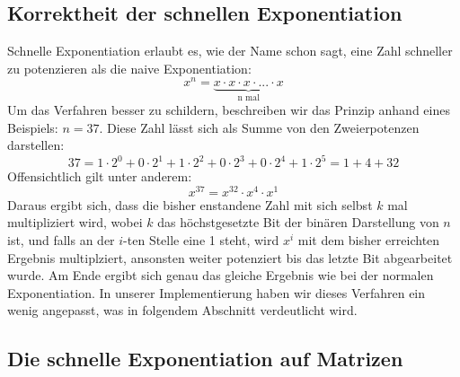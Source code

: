\documentclass[course=erap]{aspdoc}
\begin{document}
\subsection{Korrektheit der schnellen Exponentiation}%
Schnelle Exponentiation erlaubt es, wie der Name schon sagt, eine Zahl schneller zu potenzieren als die naive Exponentiation: \begin{equation}
x^n = \underbrace{x \cdot x \cdot x \cdot ... \cdot x}_\text{n mal}
\end{equation} 
Um das Verfahren besser zu schildern, beschreiben wir das Prinzip anhand eines Beispiels: $n = 37$. Diese Zahl lässt sich als Summe von den Zweierpotenzen darstellen:
\begin{equation}
 37 = 1 \cdot 2^0 + 0 \cdot 2^1 + 1 \cdot 2^2 + 0 \cdot 2^3 + 0 \cdot 2^4 + 1 \cdot 2^5 = 1 + 4 + 32
\end{equation}
Offensichtlich gilt unter anderem: 
\begin{equation}
    x^{37} = x^{32} \cdot x^4 \cdot x^1
\end{equation}
Daraus ergibt sich, dass die bisher enstandene Zahl mit sich selbst $k$ mal multipliziert wird, wobei $k$ das höchstgesetzte Bit der binären Darstellung von $n$ ist, und falls an der $i$-ten Stelle eine 1 steht, wird $x^i$ mit dem bisher erreichten Ergebnis multiplziert, ansonsten weiter potenziert bis das letzte Bit abgearbeitet wurde. Am Ende ergibt sich genau das gleiche Ergebnis wie bei der normalen Exponentiation. In unserer Implementierung haben wir dieses Verfahren ein wenig angepasst, was in folgendem Abschnitt verdeutlicht wird. 
\subsection{Die schnelle Exponentiation auf Matrizen}%
\end{document}
